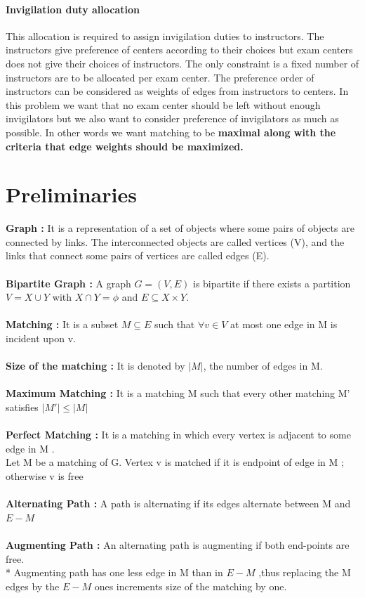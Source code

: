 \documentclass[a4paper]{report}
\theoremstyle{definition}
\begin{document}
\subsubsection{Invigilation duty allocation} 
This allocation is required to assign invigilation duties to instructors. The instructors give preference of centers according to their choices but exam centers does not give their choices of instructors. The only constraint is a fixed number of instructors are to be allocated per exam center. The preference order of instructors can be considered as weights of edges from instructors to centers. In this problem we want that no exam center should be left without enough invigilators but we also want to consider preference of invigilators as much as possible. In other words we want matching to be \textbf{maximal along with the criteria that edge weights should be maximized.}

\chapter{Preliminaries}
\textbf{Graph :} It is a representation of a set of objects where some pairs of objects are connected by links. The interconnected objects are called vertices (V), and the links that connect some pairs of vertices are called edges (E).\\ \\
\textbf{Bipartite Graph :}	A graph $G=(V,E)$ is bipartite if there exists a partition $V= X \cup Y $ with $ X \cap Y=\phi$ and $E \subseteq X \times Y$.\\ \\
\textbf{Matching :} It is a subset $M \subseteq E $ such that $\forall v \in V$ at most one edge in M is incident upon v.\\ \\
\textbf{Size of the matching :} It is denoted by $|M|$, the number of edges in M.\\ \\
\textbf{Maximum Matching :} It is a matching M such that every other matching M' satisfies $|M'|\leq|M|$\\ \\
\textbf{Perfect Matching :} It is a matching in which every vertex is adjacent to some edge in M .\\
Let M be a matching of G. Vertex v is matched if it is endpoint of edge in M ;
otherwise v is free\\ \\
\textbf{Alternating Path :} A path is alternating if its edges alternate between
M and $E-M$\\ \\
\textbf{Augmenting Path :} An alternating path is augmenting if both end-points are free.\\*
Augmenting path has one less edge in M than in
$E - M$ ,thus replacing the M edges by the $E - M$ ones increments size of the matching by one.
\end{document}
